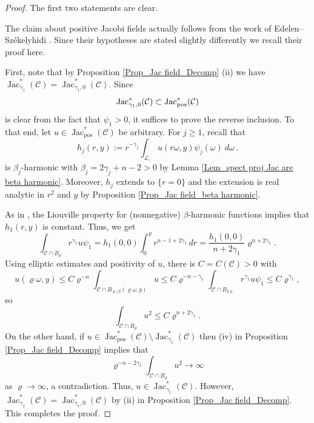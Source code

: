 \documentclass[11pt, letterpaper, reqno]{amsart}
\numberwithin{equation}{section}
\theoremstyle{remark}
\newcommand{\cC}{\mathcal{C}}
\newcommand{\cL}{\mathcal{L}}
\newcommand{\Jac}{\operatorname{Jac}}
\begin{document}
    
    \begin{proof} 
    The first two statements are clear. 
    
    The claim about positive Jacobi fields actually follows from the work of Edelen--Sz\'ekelyhidi \cite[Lemma 2.7]{EdelenSzekelyhidi:liouville}. Since their hypotheses are stated slightly differently we recall their proof here. 
    
    First, note that by Proposition \ref{Prop_Jac field_Decomp} {(ii)} we have $\Jac^*_{\gamma_1}(\cC) = \Jac^*_{\gamma_1,0}(\cC)$. Since 
    \[
    \Jac^*_{\gamma_1,0}(\cC) \subset \Jac^*_\textnormal{pos}(\cC)
    \] is clear from the fact that $\psi_1 > 0$, it suffices to prove the reverse inclusion. To that end, let $u \in \Jac^*_\textrm{pos}(\cC)$ be arbitrary. For $j\geq 1$, recall that
    \begin{equation*} 
        h_j(r, y):= r^{-\gamma_j}\int_{\cL_\circ} u(r\omega, y)\psi_j(\omega)\ d\omega \,.
      \end{equation*}
      is $\beta_j$-harmonic with $\beta_j = 2\gamma_j + n-2>0$ by Lemma \ref{Lem_spect proj Jac are beta harmonic}. Moreover, $h_j$ extends to $\{r=0\}$ and the extension is real analytic in $r^2$ and $y$ by Proposition \ref{Prop_Jac field_beta harmonic}. 
      
      As in \cite[(19)]{EdelenSzekelyhidi:liouville}, the Liouville property for (nonnegative) $\beta$-harmonic functions implies that $h_1(r,y)$ is constant. Thus, we get
    \[
    \int_{\cC \cap B_\varrho} r^{\gamma_1} u \psi_1 = h_1(0,0) \int_0^\varrho r^{n-1+2\gamma_1} \, dr = \frac{h_1(0,0)}{n+2\gamma_1} \varrho^{n+2\gamma_1}. 
    \]
    Using elliptic estimates and positivity of $u$, there is $C=C(\cC) > 0$ with
    \[
u(\varrho \omega,y) \leq C \varrho^{-n} \int_{\cC \cap B_{\varrho/2}(\varrho\omega,y)} u \leq C  \varrho^{-n-\gamma_1} \int_{\cC \cap B_{2\varrho}} r^{\gamma_1} u \psi_1 \leq C \varrho^{\gamma_1} ,
\] 
so
   \[
   \int_{\cC \cap B_\varrho} u^2 \leq C \varrho^{n+2\gamma_1}. 
   \]
   On the other hand, if $u \in \Jac^*_\textrm{pos}(\cC) \setminus \Jac^*_{\gamma_1}(\cC)$ then {(iv)} in Proposition \ref{Prop_Jac field_Decomp} implies that
\[
\varrho^{-n - 2\gamma_1} \int_{\cC \cap B_\varrho} u^2 \to \infty
\]
as $\varrho\to\infty$, a contradiction. Thus, $u \in \Jac^*_{\gamma_1}(\cC)$. However, $\Jac^*_{\gamma_1}(\cC) = \Jac^*_{\gamma_1,0}(\cC)$ by {(ii)} in Proposition \ref{Prop_Jac field_Decomp}. This completes the proof. 
    \end{proof}
    
\end{document}
